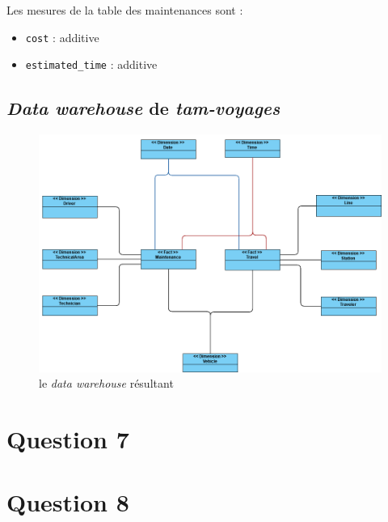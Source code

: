 \documentclass[a4paper,12pt]{report}
\begin{document}
Les mesures de la table des maintenances sont :
\begin{itemize}
  \item \texttt{cost} : additive
  \item \texttt{estimated\_time} : additive
\end{itemize}

\newpage

\subsection*{\textit{Data warehouse} de \textit{tam-voyages}}
\label{subsec:data_warehouse}
\begin{figure}[!ht]
  \centering
  \includegraphics{images/data_warehouse.png}
  \caption{le \textit{data warehouse} résultant}
\end{figure}

\section*{Question 7}
\label{sec:question_7}

\section*{Question 8}
\label{sec:question_8}
\end{document}
